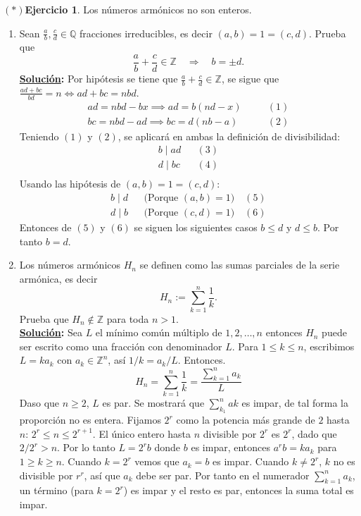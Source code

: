 \documentclass[11pt,letterpaper]{article}
\theoremstyle{definition}\newtheorem{p}{Ejercicio}
\theoremstyle{definition}\newtheorem{pp}[p]{$(*)$Ejercicio}
\numberwithin{p}{section}
\newcommand{\Z}{\mathbb{Z}}
\newcommand{\Q}{\mathbb{Q}}
\newcommand{\ent}{\Longrightarrow}
\newcommand{\sol}{\textbf{\underline{Solución}: }} %
\begin{document}
\begin{pp}
  Los n\'umeros arm\'onicos no son enteros. 
  \begin{enumerate}
  \item Sean $\frac{a}{b},\frac{c}{d}\in\Q$ fracciones irreducibles, es decir $(a,b)=1=(c,d)$. Prueba que
    \[
      \frac{a}{b}+\frac{c}{d}\in\Z \quad\ent\quad b=\pm d.
    \]
    \sol Por hipótesis se tiene que $\frac{a}{b}+\frac{c}{d}\in\Z$, se sigue que 
    $\frac{ad+bc}{bd}=n \iff ad+bc=nbd$.
    \begin{align*}
    ad = nbd - bx \implies ad = b(nd -x) && \quad (1)\\
    bc = nbd - ad \implies bc = d(nb -a) && \quad (2)
    \end{align*}
    Teniendo $(1)$ y $(2)$, se aplicará en ambas la definición de divisibilidad:
    \begin{align*}
    b \mid ad && (3)\\
    d \mid bc && (4)\\
    \end{align*}
    Usando las hipótesis de $(a,b)=1=(c,d)$:
    \begin{align*}
    b \mid d && \text{(Porque $(a,b)=1$)} \quad (5)\\
    d \mid b && \text{(Porque $(c,d)=1$)} \quad (6)
    \end{align*}
    Entonces de $(5)$ y $(6)$ se siguen los siguientes casos $b \leq d$ y $d  \leq b$. Por tanto $b=d$.
  \item Los n\'umeros arm\'onicos $H_n$ se definen como las sumas parciales de la serie arm\'onica, es decir
  \[
    H_n:=\sum_{k=1}^n\frac{1}{k}.
  \]
  Prueba que $H_n\not\in\Z$ para toda $n>1$.\\
  \sol Sea $L$ el mínimo común múltiplo de $1,2,\ldots,n$ entonces $H_n$ puede ser escrito como una fracción 
  con denominador $L$. Para $1 \leq k \leq n$, escribimos $L = ka_k$ con $a_k \in \Z^n$, 
  así $1/k = a_k/L$. Entonces.
  $$H_n = \sum_{k=1}^{n} \frac{1}{k}= \frac{\sum_{k=1}^{n} a_k} {L}$$
  Daso que $n \geq 2$, $L$ es par. Se mostrará que $\sum_{k_1}^{n}ak$ es impar, de tal forma la proporción 
  no es entera. Fijamos $2^r$ como la potencia más grande de $2$ hasta $n$: $2^r \leq n \leq 2^{r+1}$. 
  El único entero hasta $n$ divisible por $2^r$ es $2^r$, dado que $2/2^r > n$. Por lo tanto $L = 2^rb$ 
  donde $b$ es impar, entonces $a^rb = ka_k$ para $1 \geq k \geq n$. Cuando $k = 2^r$ vemos que $a_k=b$ es 
  impar. Cuando $k \neq 2^r$, $k$ no es divisible por $r^r$, así que $a_k$ debe ser par. Por tanto en el 
  numerador $\sum_{k=1}^{n}a_k$, un término (para $k=2^r$) es impar y el resto es par, entonces la suma 
  total es impar.
  \end{enumerate}
\end{pp}
\end{document}
